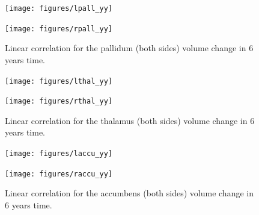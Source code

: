 \documentclass[11pt]{article}
\theoremstyle{definition}
\theoremstyle{remark}
\begin{document}
\begin{figure}[!htb]
    \centering
    \begin{minipage}{.45\textwidth}
        \centering
        \texttt{[image: figures/lpall\_yy]} %
    \end{minipage}%
    \hfill
    \begin{minipage}{0.45\textwidth}
        \centering
        \texttt{[image: figures/rpall\_yy]}
    \end{minipage}
    \caption{Linear correlation for the pallidum (both sides) volume change in 6 years time.}
    \label{fig:pallyy}
\end{figure}

\begin{figure}[!htb]
    \centering
    \begin{minipage}{.45\textwidth}
        \centering
        \texttt{[image: figures/lthal\_yy]} %
    \end{minipage}%
    \hfill
    \begin{minipage}{0.45\textwidth}
        \centering
        \texttt{[image: figures/rthal\_yy]}
    \end{minipage}
    \caption{Linear correlation for the thalamus (both sides) volume change in 6 years time.}
    \label{fig:thalyy}
\end{figure}

\begin{figure}[!htb]
    \centering
    \begin{minipage}{.45\textwidth}
        \centering
        \texttt{[image: figures/laccu\_yy]} %
    \end{minipage}%
    \hfill
    \begin{minipage}{0.45\textwidth}
        \centering
        \texttt{[image: figures/raccu\_yy]}
    \end{minipage}
    \caption{Linear correlation for the accumbens (both sides) volume change in 6 years time.}
    \label{fig:accuyy}
\end{figure}
\end{document}
